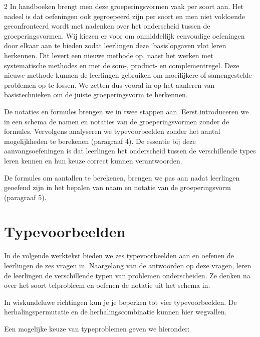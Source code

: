 \begin{multicols}{2}
In handboeken brengt men deze groeperingsvormen vaak per soort aan. Het nadeel is dat oefeningen ook gegroepeerd zijn per soort en men niet voldoende geconfronteerd wordt met nadenken over het onderscheid tussen de groeperingsvormen. Wij kiezen er voor om onmiddellijk eenvoudige oefeningen door elkaar aan te bieden zodat leerlingen  deze `basis'opgaven vlot leren herkennen. Dit levert een nieuwe methode op, naast het werken met systematische methodes en met de som-, product- en complementregel. Deze nieuwe methode kunnen de leerlingen gebruiken om moeilijkere of samengestelde problemen op te lossen. We zetten dus vooral in op het aanleren van basistechnieken om de juiste groeperingsvorm te herkennen. 

De notaties en formules brengen we in twee stappen aan. Eerst introduceren we in een schema de namen en notaties van de groeperingsvormen zonder de formules. Vervolgens analyseren we typevoorbeelden zonder het aantal mogelijkheden te berekenen (paragraaf 4). De essentie bij deze aanvangsoefeningen is dat leerlingen het onderscheid tussen de verschillende types leren kennen en hun keuze correct kunnen verantwoorden. 

De formules om aantallen te berekenen, brengen we pas aan nadat leerlingen geoefend zijn in het bepalen van naam en notatie van de groeperingsvorm (paragraaf 5). 

\section{Typevoorbeelden}

In de volgende werktekst bieden we zes typevoorbeelden aan en oefenen de leerlingen de zes vragen in. Naargelang van de antwoorden op deze vragen, leren de leerlingen de verschillende typen van problemen onderscheiden. Ze denken na over het soort telprobleem en oefenen de notatie uit het schema in. 

In wiskundeluwe richtingen kun je je beperken tot vier typevoorbeelden. De herhalingspermutatie en de herhalingscombinatie kunnen hier wegvallen.

Een mogelijke keuze van typeproblemen geven we hieronder:


\end{multicols}
